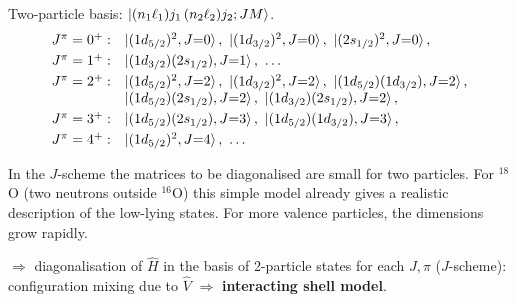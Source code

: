 \documentclass[11pt,a4paper]{article}
\newcommand{\op}[1]{\hat{#1}}
\begin{document}
Two-particle basis: $\ket{(n_1\ell_1)j_1\,(n_2\ell_2)j_2;JM}$.
\[
\begin{array}{ll}
J^\pi=0^+: & \ket{(1d_{5/2})^2,J{=}0},\ \ket{(1d_{3/2})^2,J{=}0},\ \ket{(2s_{1/2})^2,J{=}0},\\[1mm]
J^\pi=1^+: & \ket{(1d_{3/2})(2s_{1/2}),J{=}1},\ \dots\\[1mm]
J^\pi=2^+: & \ket{(1d_{5/2})^2,J{=}2},\ \ket{(1d_{3/2})^2,J{=}2},\ \ket{(1d_{5/2})(1d_{3/2}),J{=}2},\\
           & \ket{(1d_{5/2})(2s_{1/2}),J{=}2},\ \ket{(1d_{3/2})(2s_{1/2}),J{=}2},\\[1mm]
J^\pi=3^+: & \ket{(1d_{5/2})(2s_{1/2}),J{=}3},\ \ket{(1d_{5/2})(1d_{3/2}),J{=}3},\\[1mm]
J^\pi=4^+: & \ket{(1d_{5/2})^2,J{=}4},\ \dots
\end{array}
\]

In the $J$-scheme the matrices to be diagonalised are small for two particles. For ${}^{18}$O (two neutrons outside ${}^{16}$O) this simple model already gives a realistic description of the low-lying states. For more valence particles, the dimensions grow rapidly.


$\Rightarrow$ diagonalisation of $\op H$ in the basis of 2-particle states for each $J,\pi$ ($J$-scheme): configuration mixing due to $\op V$ $\Rightarrow$ \textbf{interacting shell model}.
\end{document}
